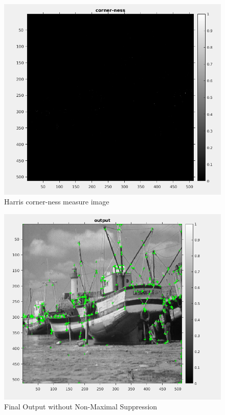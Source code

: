 \documentclass{article}
\begin{document}
\newpage


\begin{figure}[h!]
  \includegraphics[width=\linewidth]{corner_ness.png}
  \caption{Harris corner-ness measure image}
  \label{fig:result2}
\end{figure}

\newpage


\begin{figure}[h!]
  \includegraphics[width=\linewidth]{without_non_maaximal.png}
  \caption{Final Output without Non-Maximal Suppression}
  \label{fig:result2}
\end{figure}
\end{document}
